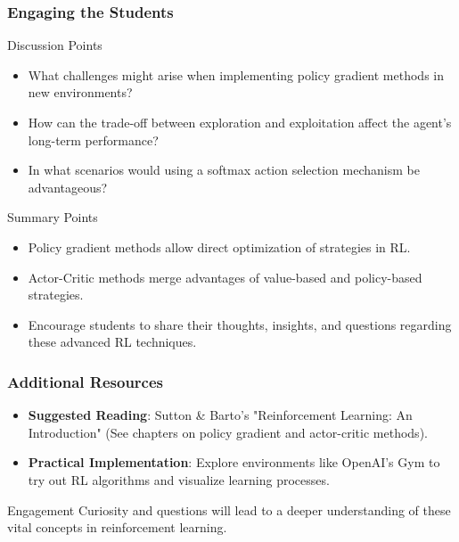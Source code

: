 \documentclass[aspectratio=169]{beamer}
\begin{document}
\begin{frame}[fragile]
    \frametitle{Engaging the Students}
    \begin{block}{Discussion Points}
        \begin{itemize}
            \item What challenges might arise when implementing policy gradient methods in new environments?
            \item How can the trade-off between exploration and exploitation affect the agent's long-term performance?
            \item In what scenarios would using a softmax action selection mechanism be advantageous?
        \end{itemize}
    \end{block}

    \begin{block}{Summary Points}
        \begin{itemize}
            \item Policy gradient methods allow direct optimization of strategies in RL.
            \item Actor-Critic methods merge advantages of value-based and policy-based strategies.
            \item Encourage students to share their thoughts, insights, and questions regarding these advanced RL techniques.
        \end{itemize}
    \end{block}
\end{frame}

\begin{frame}[fragile]
    \frametitle{Additional Resources}
    \begin{itemize}
        \item \textbf{Suggested Reading}: Sutton \& Barto’s "Reinforcement Learning: An Introduction" (See chapters on policy gradient and actor-critic methods).
        \item \textbf{Practical Implementation}: Explore environments like OpenAI's Gym to try out RL algorithms and visualize learning processes.
    \end{itemize}

    \begin{block}{Engagement}
        Curiosity and questions will lead to a deeper understanding of these vital concepts in reinforcement learning. 
    \end{block}
\end{frame}
\end{document}
